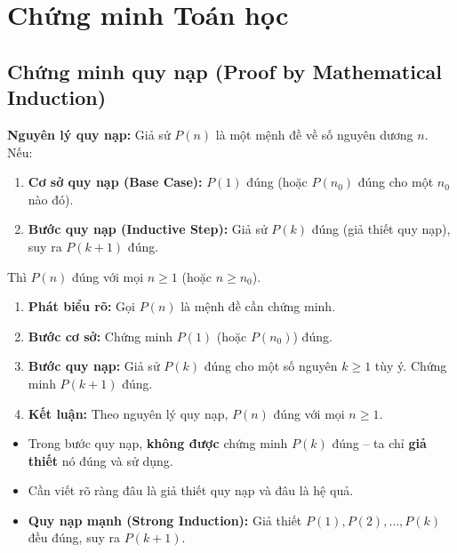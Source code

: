 \documentclass[12pt,a4paper]{article}
\begin{document}
\section{Chứng minh Toán học}

\subsection{Chứng minh quy nạp (Proof by Mathematical Induction)}

\begin{dinhnghia}[title={Nguyên lý quy nạp toán học}]
  \textbf{Nguyên lý quy nạp:} Giả sử $P(n)$ là một mệnh đề về số nguyên dương $n$. Nếu:
  \begin{enumerate}
    \item \textbf{Cơ sở quy nạp (Base Case):} $P(1)$ đúng (hoặc $P(n_0)$ đúng cho một $n_0$ nào đó).
    \item \textbf{Bước quy nạp (Inductive Step):} Giả sử $P(k)$ đúng (giả thiết quy nạp), suy ra $P(k+1)$ đúng.
  \end{enumerate}
  Thì $P(n)$ đúng với mọi $n \ge 1$ (hoặc $n \ge n_0$).
\end{dinhnghia}

\begin{phuongphap}[title={Các bước viết chứng minh quy nạp}]
  \begin{enumerate}
    \item \textbf{Phát biểu rõ:} Gọi $P(n)$ là mệnh đề cần chứng minh.
    \item \textbf{Bước cơ sở:} Chứng minh $P(1)$ (hoặc $P(n_0)$) đúng.
    \item \textbf{Bước quy nạp:} Giả sử $P(k)$ đúng cho một số nguyên $k \ge 1$ tùy ý. Chứng minh $P(k+1)$ đúng.
    \item \textbf{Kết luận:} Theo nguyên lý quy nạp, $P(n)$ đúng với mọi $n \ge 1$.
  \end{enumerate}
\end{phuongphap}

\begin{luuy}
  \begin{itemize}
    \item Trong bước quy nạp, \textbf{không được} chứng minh $P(k)$ đúng -- ta chỉ \textbf{giả thiết} nó đúng và sử dụng.
    \item Cần viết rõ ràng đâu là giả thiết quy nạp và đâu là hệ quả.
    \item \textbf{Quy nạp mạnh (Strong Induction):} Giả thiết $P(1), P(2), \ldots, P(k)$ đều đúng, suy ra $P(k+1)$.
  \end{itemize}
\end{luuy}
\end{document}
